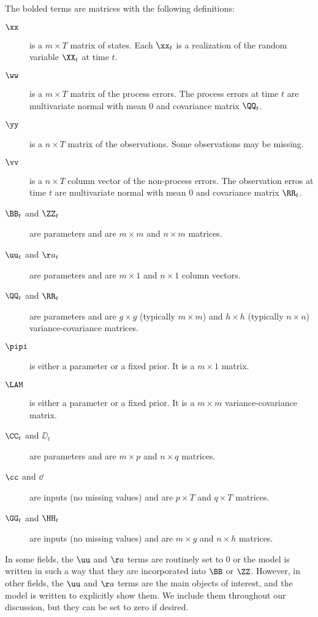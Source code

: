 The bolded terms are matrices with the following definitions: 
 \begin{description}
	\item[$\xx$] is a $m \times T$ matrix of states.  Each $\xx_t$ is a realization of the random variable $\XX_t$ at time $t$.
	\item[$\ww$] is a $m \times T$ matrix of the process errors.  The process errors at time $t$ are multivariate normal with mean 0 and covariance matrix $\QQ_t$.
	\item[$\yy$] is a $n \times T$ matrix of the observations.   Some observations may be missing.
	\item[$\vv$] is a $n \times T$ column vector of the non-process errors.  The observation erros at time $t$ are multivariate normal with mean 0 and covariance matrix $\RR_t$.
	\item[$\BB_t$ and $\ZZ_t$] are parameters and are $m \times m$ and $n \times m$ matrices.
	\item[$\uu_t$ and $\aa_t$] are parameters and are $m \times 1$ and $n \times 1$ column vectors.
	\item[$\QQ_t$ and $\RR_t$] are parameters and are $g \times g$ (typically $m \times m$) and $h \times h$ (typically $n \times n$) variance-covariance matrices.
	\item[$\pipi$] is either a parameter or a fixed prior. It is a $m \times 1$ matrix.
	\item[$\LAM$] is either a parameter or a fixed prior. It is a $m \times m$ variance-covariance matrix.
	\item[$\CC_t$ and $\DD_t$] are parameters and are $m \times p$ and $n \times q$ matrices.
	\item[$\cc$ and $\dd$] are inputs (no missing values) and are $p \times T$ and $q \times T$ matrices.
  \item[$\GG_t$ and $\HH_t$] are inputs (no missing values) and are $m \times g$ and $n \times h$ matrices.
\end{description}

In some fields, the $\uu$ and $\aa$ terms are routinely set to 0 or the model is written in such a way that they are incorporated into $\BB$ or $\ZZ$.  However, in other fields, the $\uu$ and $\aa$ terms are the main objects of interest, and the model is written to explicitly show them.  We include them throughout our discussion, but they can be set to zero if desired. 


